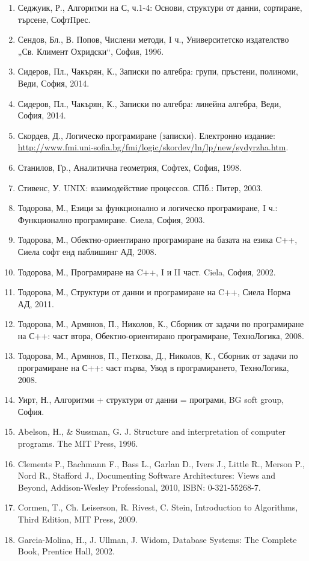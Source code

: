 \begin{enumerate}
\item Седжуик, Р., Алгоритми на С, ч.1-4: Основи, структури от данни, сортиране, търсене, СофтПрес.
\item Сендов, Бл., В. Попов, Числени методи, I ч., Университетско издателство „Св. Климент Охридски“, София, 1996.
\item Сидеров, Пл., Чакърян, К., Записки по алгебра: групи, пръстени, полиноми, Веди, София, 2014.
\item Сидеров, Пл., Чакърян, К., Записки по алгебра: линейна алгебра, Веди, София, 2014.
\item Скордев, Д., Логическо програмиране (записки). Електронно издание: \url{http://www.fmi.uni-sofia.bg/fmi/logic/skordev/ln/lp/new/sydyrzha.htm}.
\item Станилов, Гр., Аналитична геометрия, Софтех, София, 1998.
\item Стивенс, У. UNIX: взаимодействие процессов. СПб.: Питер, 2003.
\item Тодорова, М., Езици за функционално и логическо програмиране, I ч.: Функционално програмиране. Сиела, София, 2003.
\item Тодорова, М., Обектно-ориентирано програмиране на базата на езика C++, Сиела софт енд паблишинг АД, 2008.
\item Тодорова, М., Програмиране на C++, I и II част. Ciela, София, 2002.
\item Тодорова, М., Структури от данни и програмиране на C++, Сиела Норма АД, 2011.
\item Тодорова, М., Армянов, П., Николов, К., Сборник от задачи по програмиране на С++: част втора, Обектно-ориентирано програмиране, ТехноЛогика, 2008.
\item Тодорова, М., Армянов, П., Петкова, Д., Николов, К., Сборник от задачи по програмиране на С++: част първа, Увод в програмирането, ТехноЛогика, 2008.
\item Уирт, Н., Алгоритми + структури от данни = програми, BG soft group, София.
\item Abelson, H., \& Sussman, G. J. Structure and interpretation of computer programs. The MIT Press, 1996.
\item Clements P., Bachmann F., Bass L., Garlan D., Ivers J., Little R., Merson P., Nord R., Stafford J., Documenting Software Architectures: Views and Beyond, Addison-Wesley Professional, 2010, ISBN: 0-321-55268-7.
\item Cormen, T., Ch. Leiserson, R. Rivest, C. Stein, Introduction to Algorithms, Third Edition, MIT Press, 2009.
\item Garcia-Molina, H., J. Ullman, J. Widom, Database Systems: The Complete Book, Prentice Hall, 2002.

\end{enumerate}

